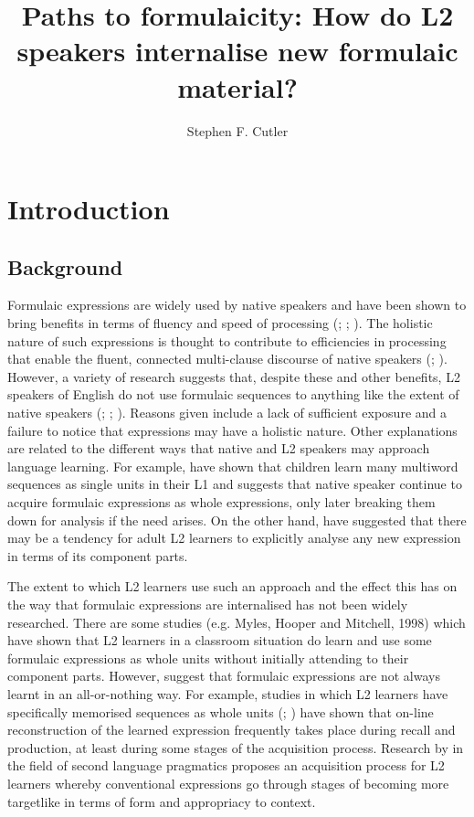 \documentclass[output=paper]{langscibook}
\author{Stephen F. Cutler\affiliation{Cardiff University}}
\title[Paths to formulaicity: How do L2 speakers internalise formulaic material?]{Paths to formulaicity: How do L2 speakers internalise new formulaic material?}
\begin{document}
\maketitle 

\section{Introduction} 
\subsection{Background}

Formulaic expressions are widely used by native speakers and have been shown to bring benefits in terms of fluency and speed of processing (\citealt{Siyanova-ChanturiaSidtis2019}; \citealt{TowellEtAl1996}; \citealt{Wray2002}). The holistic nature of such expressions is thought to contribute to efficiencies in processing that enable the fluent, connected multi-clause discourse of native speakers (\citealt{PawleySyder1983}; \citealt{TremblayBaayen2010}). However, a variety of research suggests that, despite these and other benefits, L2 speakers of English do not use formulaic sequences to anything like the extent of native speakers (\citealt{Granger2019}; \citealt{Meunier2012}; \citealt{PaquotGranger2012}). Reasons given include a lack of sufficient exposure and a failure to notice that expressions may have a holistic nature. Other explanations \citep{Wray2019} are related to the different ways that native and L2 speakers may approach language learning. For example, \citet{DabrowskaLieven2005} have shown that children learn many multiword sequences as single units in their L1 and \citet{Wray2002} suggests that native speaker continue to acquire formulaic expressions as whole expressions, only later breaking them down for analysis if the need arises. On the other hand, \citet{WrayPerkins2000} have suggested that there may be a tendency for adult L2 learners to explicitly analyse any new expression in terms of its component parts. 

The extent to which L2 learners use such an approach and the effect this has on the way that formulaic expressions are internalised has not been widely researched. There are some studies (e.g. Myles, Hooper and Mitchell, 1998) which have shown that L2 learners in a classroom situation do learn and use some formulaic expressions as whole units without initially attending to their component parts. However, \citet{SchmittCarter2004} suggest that formulaic expressions are not always learnt in an all-or-nothing way. For example, studies in which L2 learners have specifically memorised sequences as whole units (\citealt{BoersLindstromberg2012}; \citealt{WrayFitzpatrick2008}) have shown that on-line reconstruction of the learned expression frequently takes place during recall and production, at least during some stages of the acquisition process. Research by \citet{Bardovi-Harlig2019} in the field of second language pragmatics proposes an acquisition process for L2 learners whereby conventional expressions go through stages of becoming more targetlike in terms of form and appropriacy to context. 
\end{document}

